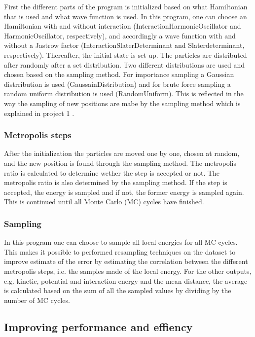 First the different parts of the program is initialized based on what Hamiltonian that is used and what wave function is used. In this program, one can choose an Hamiltonian with and without interaction (InteractionHarmonicOscillator and HarmonicOscillator, respectively), and accordingly a wave function with and without a Jastrow factor (InteractionSlaterDeterminant and Slaterdeterminant, respectively). Thereafter, the initial state is set up. The particles are distributed after randomly after a set distribution. Two different distributions are used and chosen based on the sampling method. For importance sampling a Gaussian distrribution is used (GaussainDistribution) and for brute force sampling a random uniform distribution is used (RandomUniform). This is reflected in the way the sampling of new positions are mabe by the sampling method which is explained in project 1 \cite{project1}.

\subsubsection{Metropolis steps}

After the initialization the particles are moved one by one, chosen at random, and the new position is found through the sampling method. The metropolis ratio is calculated to determine wether the step is accepted or not. The metropolis ratio is also determined by the sampling method. If the step is accepted, the energy is sampled and if not, the former energy is sampled again. This is continued until all Monte Carlo (MC) cycles have finished. 

\subsubsection{Sampling}

In this program one can choose to sample all local energies for all MC cycles. This makes it possible to performed resampling techniques on the dataset to improve estimate of the error by estimating the correlation between the different metropolis steps, i.e. the samples made of the local energy. For the other outputs, e.g. kinetic, potential and interaction energy and the mean distance, the average is calculated based on the sum of all the sampled values by dividing by the number of MC cycles.

\subsection{Improving performance and effiency}

